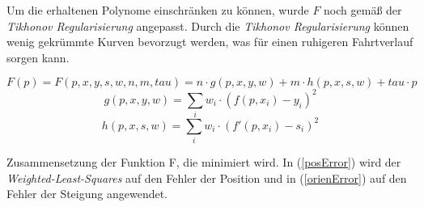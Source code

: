 Um die erhaltenen Polynome einschränken zu können, wurde $F$ noch gemäß der \textit{Tikhonov Regularisierung} \cite{kaipio2006statistical} angepasst. Durch die \textit{Tikhonov Regularisierung} können wenig gekrümmte Kurven bevorzugt werden, was für einen ruhigeren Fahrtverlauf sorgen kann.
\begin{ownequation}[H]
\begin{equation}
\label{minimizeFunction}
F(p) = F(p,x,y,s,w,n,m,tau) = n \cdot g(p,x,y,w) + m \cdot h(p,x,s,w) + tau \cdot p
\end{equation}
\begin{equation}
\label{posError}
g(p,x,y,w) = \sum_{i} w_i \cdot (f(p,x_i)-y_i)^2
\end{equation}
\begin{equation}
\label{orienError}
h(p,x,s,w) = \sum_{i} w_i \cdot (f'(p,x_i)-s_i)^2
\end{equation}
\caption{Zusammensetzung der Funktion F, die minimiert wird. In (\ref{posError}) wird der \textit{Weighted-Least-Squares} auf den Fehler der Position und in (\ref{orienError}) auf den Fehler der Steigung angewendet.}
\label{F-function}
\end{ownequation}

